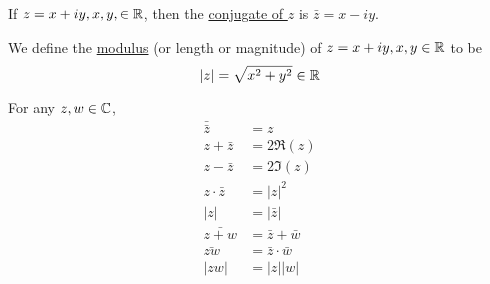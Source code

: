 \documentclass[11pt]{article}
\begin{document}
\begin{definition}
If $z = x + iy, x, y, \in \mathbb{R}$, then the \underline{conjugate of $z$} is
$\bar{z} = x - iy$.
\end{definition}
\begin{definition}
We define the \underline{modulus} (or length or magnitude) of $z = x + iy, x, y
\in \mathbb{R}$ to be
\begin{equation*}
|z| = \sqrt{x^2 + y^2} \in \mathbb{R}
\end{equation*}
\end{definition}
\begin{remark}
For any $z, w \in \mathbb{C}$,
\begin{align*}
\bar{\bar{z}} &= z\\
z + \bar{z} &= 2\Re(z)\\
z - \bar{z} &= 2\Im(z)\\
z\cdot\bar{z} &= |z|^2\\
|z| &= |\bar{z}|\\
\bar{z+w} &= \bar z + \bar w\\
\bar{zw} &= \bar z\cdot\bar w\\
|zw| &= |z||w|
\end{align*}
\end{remark}
\end{document}
